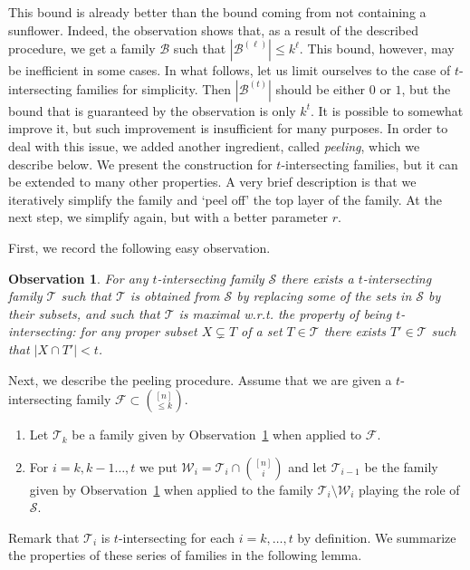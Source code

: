 \documentclass[graybox]{svmult}
\renewcommand{\le}{\leqslant}
\newcommand{\ff}{\mathcal{F}}
\newcommand{\s}{\mathcal{S}}
\newcommand{\bb}{\mathcal{B}}
\newcommand{\m}{\mathcal}
\newcommand{\T}{\mathcal{T}}
\newcommand{\W}{\mathcal{W}}
\newtheorem{obs}[thm]{Observation}
\begin{document}
This bound is already better than the bound coming from not containing a sunflower. Indeed, the observation shows that, as a result of the described procedure, we get a family $\bb$ such that  $|\bb^{(\ell)}|\le k^{\ell}$. This bound, however, may be inefficient in some cases. In what follows, let us limit ourselves to the case of  $t$-intersecting families for simplicity. Then $|\bb^{(t)}|$ should be either $0$ or $1$, but the bound that is guaranteed by the observation is only $k^t$. It is possible to somewhat improve it, but such improvement is insufficient for many purposes. In order to deal with this issue, we added another ingredient, called {\it peeling}, which we describe below. We present the construction for $t$-intersecting families, but it can be extended to many other properties. A very brief description is that we iteratively simplify the family and `peel off' the top layer of the family. At the next step, we simplify again, but with a better parameter $r$.

First, we record the following easy observation.
\begin{obs}\label{obs22}
For any  $t$-intersecting family $\s$ there exists a $t$-intersecting family $\T $ such that $\T$ is obtained from $\s$ by replacing some of the sets in $\s$ by their subsets, and such that $\T$ is maximal w.r.t. the property of being $t$-intersecting: for any proper subset $X \subsetneq T$ of a set $T\in \m T$ there exists $T' \in \T$ such that $|X \cap T'| < t$.
\end{obs}


Next, we describe the peeling procedure. Assume that we are given a $t$-intersecting family $\ff\subset {[n]\choose \le k}$.
\begin{enumerate}
    \item Let $\T_k$ be a family given by Observation~\ref{obs22} when applied to $\ff$.
    \item For $i = k, k-1\ldots, t$ we put $\W_i = \T_i \cap {[n] \choose i}$ and let $\T_{i-1}$ be the family given by Observation~\ref{obs22} when applied to the family  $\T_{i}\setminus \W_{i}$ playing the role of $\mathcal S$.
\end{enumerate}
Remark that $\T_i$ is $t$-intersecting for each $i=k,\ldots, t$ by definition. We summarize the properties of these series of families in the following lemma.
\end{document}
